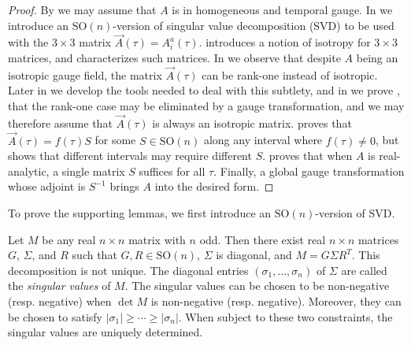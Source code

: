 \begin{proof}
By  we may assume that $A$ is in homogeneous and temporal gauge. In  we introduce an $\mathrm{SO}(n)$-version of singular value decomposition (SVD) to be used with the $3\times3$ matrix $\vec{A}(\tau)=A_{i}^{a}(\tau)$.  introduces a notion of isotropy for $3\times3$ matrices, and  characterizes such matrices. In  we observe that despite $A$ being an isotropic gauge field, the matrix $\vec{A}(\tau)$ can be rank-one instead of isotropic. Later in  we develop the tools needed to deal with this subtlety, and in  we prove , that the rank-one case may be eliminated by a gauge transformation, and we may therefore assume that $\vec{A}(\tau)$ is always an isotropic matrix.  proves that $\vec{A}(\tau)=f(\tau)S$ for some $S\in\mathrm{SO}(n)$ along any interval where $f(\tau)\neq0$, but  shows that different intervals may require different $S$.  proves that when $A$ is real-analytic, a single matrix $S$ suffices for all $\tau$. Finally, a global gauge transformation whose adjoint is $S^{-1}$ brings $A$ into the desired form.  
\end{proof}
To prove the supporting lemmas, we first introduce an $\mathrm{SO}(n)$-version of SVD.
\begin{lem}
\label{lem:SVD-SOn}Let $M$ be any real $n\times n$ matrix with $n$ odd. Then there exist real $n\times n$ matrices $G$, $\Sigma$, and $R$ such that $G,R\in\mathrm{SO}(n)$, $\Sigma$ is diagonal, and $M=G\Sigma R^{T}$. This decomposition is not unique. The diagonal entries $(\sigma_{1},\ldots,\sigma_{n})$ of $\Sigma$ are called the \emph{singular values} of $M$. The singular values can be chosen to be non-negative (resp. negative) when $\det M$ is non-negative (resp. negative). Moreover, they can be chosen to satisfy $\left|\sigma_{1}\right|\geq\cdots\geq\left|\sigma_{n}\right|$. When subject to these two constraints, the singular values are uniquely determined. 
\end{lem}

